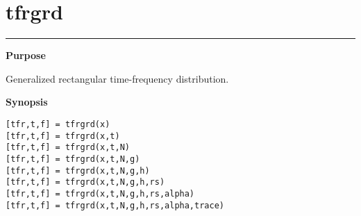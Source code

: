 

\section*{\hspace*{-1.6cm} tfrgrd}

\vspace*{-.4cm}
\hspace*{-1.6cm}\rule[0in]{16.5cm}{.02cm}
\vspace*{.2cm}

{\bf \large \sf Purpose}\\
\hspace*{1.5cm}
\begin{minipage}[t]{13.5cm}
Generalized rectangular time-frequency distribution.
\end{minipage}
\vspace*{.5cm}

{\bf \large \sf Synopsis}\\
\hspace*{1.5cm}
\begin{minipage}[t]{13.5cm}
\begin{verbatim}
[tfr,t,f] = tfrgrd(x)
[tfr,t,f] = tfrgrd(x,t)
[tfr,t,f] = tfrgrd(x,t,N)
[tfr,t,f] = tfrgrd(x,t,N,g)
[tfr,t,f] = tfrgrd(x,t,N,g,h)
[tfr,t,f] = tfrgrd(x,t,N,g,h,rs)
[tfr,t,f] = tfrgrd(x,t,N,g,h,rs,alpha)
[tfr,t,f] = tfrgrd(x,t,N,g,h,rs,alpha,trace)
\end{verbatim}
\end{minipage}
\vspace*{.5cm}

